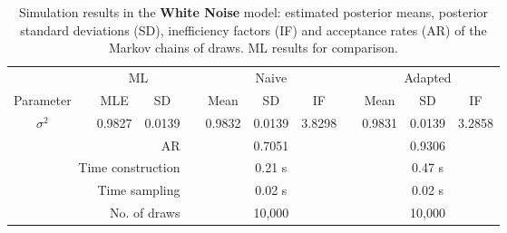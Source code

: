 { \renewcommand{\arraystretch}{1.3} 
\begin{table}[h] 
\centering 
\caption{Simulation results in the \textbf{White Noise} model: estimated posterior means, posterior standard deviations (SD), inefficiency factors (IF) and acceptance rates (AR) of the Markov chains of draws. ML results for comparison.} 
\label{tab:posterior_WN} 
\begin{tabular}{cc rr c rrr c rrr}  
 & & \multicolumn{2}{c}{ML} & & \multicolumn{3}{c}{Naive} & & \multicolumn{3}{c}{Adapted} \\  \cline{3-4} \cline{6-8} \cline{10-12} 
 Parameter & &  \multicolumn{1}{c}{MLE} &  \multicolumn{1}{c}{SD}  & &  \multicolumn{1}{c}{Mean} &  \multicolumn{1}{c}{SD} &  \multicolumn{1}{c}{IF} & &  \multicolumn{1}{c}{Mean} &  \multicolumn{1}{c}{SD} &  \multicolumn{1}{c}{IF} \\ \cline{1-1}  \cline{3-4} \cline{6-8} \cline{10-12}  
$\sigma^{2}$ & & 0.9827 &  0.0139 & & 0.9832 &  0.0139 &  3.8298 & & 0.9831 &  0.0139 &  3.2858 \\ [1ex] 
\cline{1-1}  \cline{3-4} \cline{6-8} \cline{10-12}   
\multicolumn{4}{r}{AR} & &\multicolumn{3}{c}{0.7051} &&\multicolumn{3}{c}{0.9306} \\ 
  \cline{1-4} \cline{6-8} \cline{10-12}  
 \multicolumn{4}{r}{Time construction} & &\multicolumn{3}{c}{0.21 s} &&\multicolumn{3}{c}{0.47 s} \\ 
   \multicolumn{4}{r}{Time sampling} & &\multicolumn{3}{c}{0.02 s} &&\multicolumn{3}{c}{0.02 s} \\ 
   \multicolumn{4}{r}{No. of draws }& &\multicolumn{3}{c}{10,000} &&\multicolumn{3}{c}{10,000} \\ 
  \cline{1-4} \cline{6-8} \cline{10-12} 
\hline 
\end{tabular} 
\end{table} 
} 
